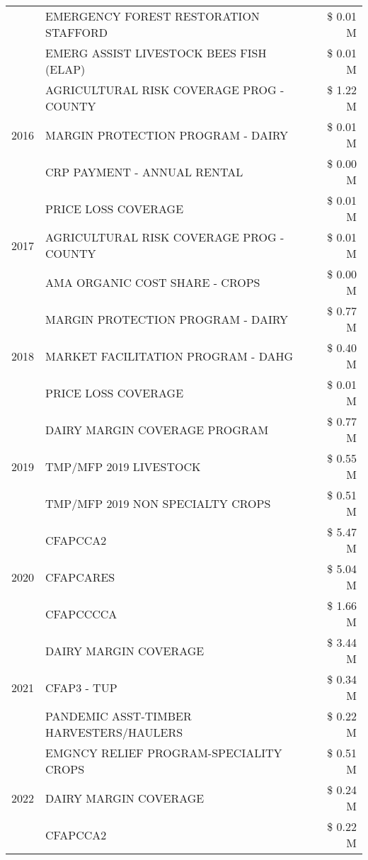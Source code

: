 \begin{tabular}{llr}
 & EMERGENCY FOREST RESTORATION STAFFORD & \$ 0.01 M \\
 & EMERG ASSIST LIVESTOCK BEES FISH (ELAP) & \$ 0.01 M \\
\cline{1-3}
\multirow[t]{3}{*}{2016} & AGRICULTURAL RISK COVERAGE PROG - COUNTY & \$ 1.22 M \\
 & MARGIN PROTECTION PROGRAM - DAIRY & \$ 0.01 M \\
 & CRP PAYMENT - ANNUAL RENTAL & \$ 0.00 M \\
\cline{1-3}
\multirow[t]{3}{*}{2017} & PRICE LOSS COVERAGE & \$ 0.01 M \\
 & AGRICULTURAL RISK COVERAGE PROG - COUNTY & \$ 0.01 M \\
 & AMA ORGANIC COST SHARE - CROPS & \$ 0.00 M \\
\cline{1-3}
\multirow[t]{3}{*}{2018} & MARGIN PROTECTION PROGRAM - DAIRY & \$ 0.77 M \\
 & MARKET FACILITATION PROGRAM - DAHG & \$ 0.40 M \\
 & PRICE LOSS COVERAGE & \$ 0.01 M \\
\cline{1-3}
\multirow[t]{3}{*}{2019} & DAIRY MARGIN COVERAGE PROGRAM & \$ 0.77 M \\
 & TMP/MFP 2019 LIVESTOCK & \$ 0.55 M \\
 & TMP/MFP 2019 NON SPECIALTY CROPS & \$ 0.51 M \\
\cline{1-3}
\multirow[t]{3}{*}{2020} & CFAPCCA2 & \$ 5.47 M \\
 & CFAPCARES & \$ 5.04 M \\
 & CFAPCCCCA & \$ 1.66 M \\
\cline{1-3}
\multirow[t]{3}{*}{2021} & DAIRY MARGIN COVERAGE & \$ 3.44 M \\
 & CFAP3 - TUP & \$ 0.34 M \\
 & PANDEMIC ASST-TIMBER HARVESTERS/HAULERS & \$ 0.22 M \\
\cline{1-3}
\multirow[t]{3}{*}{2022} & EMGNCY RELIEF PROGRAM-SPECIALITY CROPS & \$ 0.51 M \\
 & DAIRY MARGIN COVERAGE & \$ 0.24 M \\
 & CFAPCCA2 & \$ 0.22 M \\
\cline{1-3}
\bottomrule
\end{tabular}
